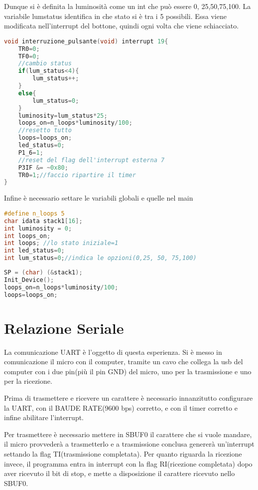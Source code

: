 \documentclass[main.tex]{subfiles}
\begin{document}
 Dunque si è definita la luminosità come un int che può essere 0, 25,50,75,100. La variabile lumstatus identifica in che stato si è tra i 5 possibili. Essa viene modificata nell'interrupt del bottone, quindi ogni volta che viene schiacciato.
 \begin{lstlisting}[language=C, caption=Interrupt pulsante,label={lst:led in C}]
 void interruzione_pulsante(void) interrupt 19{
	TR0=0;
	TF0=0;
	//cambio status
	if(lum_status<4){
		lum_status++;
	}
	else{
		lum_status=0;
	}
	luminosity=lum_status*25;
	loops_on=n_loops*luminosity/100;
	//resetto tutto
	loops=loops_on;
	led_status=0;
	P1_6=1;
	//reset del flag dell'interrupt esterna 7
	P3IF &= ~0x80;
	TR0=1;//faccio ripartire il timer
}
 \end{lstlisting}

Infine è necessario settare le variabili globali e quelle nel main
\begin{lstlisting}[language=C,caption=Variabili globali]
#define n_loops 5
char idata stack1[16];
int luminosity = 0;
int loops_on;
int loops; //lo stato iniziale=1
int led_status=0;
int lum_status=0;//indica le opzioni(0,25, 50, 75,100)
\end{lstlisting}
\begin{lstlisting}[language=C,caption=main]
SP = (char) (&stack1);
Init_Device();
loops_on=n_loops*luminosity/100;
loops=loops_on;
\end{lstlisting}



\section{Relazione Seriale}
La comunicazione UART è l'oggetto di questa esperienza. Si è messo in comunicazione il micro con il computer, tramite un cavo che collega la usb del computer con i due pin(più il pin GND) del micro, uno per la trasmissione e uno per la ricezione.

Prima di trasmettere e ricevere un carattere è necessario innanzitutto configurare la UART, con il BAUDE RATE(9600 bps) corretto, e con il timer corretto e infine abilitare l'interrupt.  

Per trasmettere è necessario mettere in SBUF0 il carattere che si vuole mandare, il micro provvederà a trasmetterlo e a trasmissione conclusa genererà un'interrupt settando la flag TI(trasmissione completata). Per quanto riguarda la ricezione invece, il programma entra in interrupt con la flag RI(ricezione completata) dopo aver ricevuto il bit di stop, e mette a disposizione il carattere ricevuto nello SBUF0.  
\end{document}
